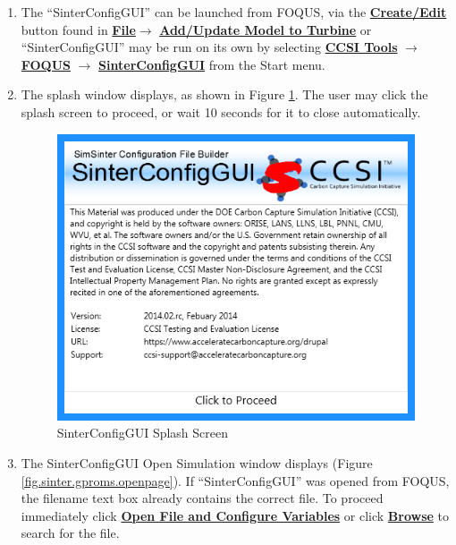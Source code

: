 \begin{enumerate}

\item The ``SinterConfigGUI'' can be launched from FOQUS, via the
  \textbf{\underline{Create/Edit}} button found in
  \textbf{\underline{File}}$\rightarrow$ \textbf{\underline{Add/Update Model to
      Turbine}}    or ``SinterConfigGUI'' may be  run on its
  own by selecting \textbf{\underline{CCSI Tools}} $\rightarrow$
  \textbf{\underline{FOQUS}} $\rightarrow$
  \textbf{\underline{SinterConfigGUI}} from the Start menu.

\item	The splash window displays, as shown in Figure \ref{fig.sinter.gproms.splash}.  The user may click the splash screen to proceed, or wait 10 seconds for it to close automatically.
\begin{figure}[H]
	\begin{center}
		\includegraphics[scale=0.55]{Chapt_sinter/figs/ap/01_Splash_Screen}
		\caption{SinterConfigGUI Splash Screen}
		\label{fig.sinter.gproms.splash}
	\end{center}
\end{figure}

\item	The SinterConfigGUI Open Simulation window displays (Figure \ref{fig.sinter.gproms.openpage}). If ``SinterConfigGUI'' was
  opened from FOQUS, the filename text box already contains the correct file.  To proceed immediately click \textbf{\underline{Open File and Configure Variables}} or click \textbf{\underline{Browse}} to search for the file.


\end{enumerate}
